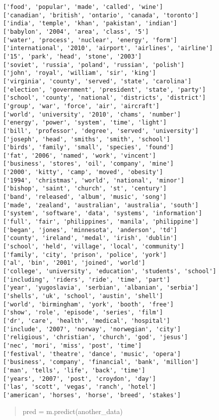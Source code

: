 \documentclass[11pt]{ctexart}
\begin{document}
\begin{Verbatim}[commandchars=\\\{\}]
['food', 'popular', 'made', 'called', 'wine']
['canadian', 'british', 'ontario', 'canada', 'toronto']
['india', 'temple', 'khan', 'pakistan', 'indian']
['babylon', '2004', 'area', 'class', '5']
['water', 'process', 'nuclear', 'energy', 'form']
['international', '2010', 'airport', 'airlines', 'airline']
['15', 'park', 'head', 'stone', '2003']
['soviet', 'russia', 'poland', 'russian', 'polish']
['john', 'royal', 'william', 'sir', 'king']
['virginia', 'county', 'served', 'state', 'carolina']
['election', 'government', 'president', 'state', 'party']
['school', 'county', 'national', 'districts', 'district']
['group', 'war', 'force', 'air', 'aircraft']
['world', 'university', '2010', 'chams', 'number']
['energy', 'power', 'system', 'time', 'light']
['bill', 'professor', 'degree', 'served', 'university']
['joseph', 'head', 'smiths', 'smith', 'school']
['birds', 'family', 'small', 'species', 'found']
['fat', '2006', 'named', 'work', 'vincent']
['business', 'stores', 'oil', 'company', 'mine']
['2000', 'kitty', 'camp', 'moved', 'obesity']
['1994', 'christmas', 'world', 'national', 'minor']
['bishop', 'saint', 'church', 'st', 'century']
['band', 'released', 'album', 'music', 'song']
['made', 'zealand', 'australian', 'australia', 'south']
['system', 'software', 'data', 'systems', 'information']
['full', 'fair', 'philippines', 'manila', 'philippine']
['began', 'jones', 'minnesota', 'anderson', 'td']
['county', 'ireland', 'medal', 'irish', 'dublin']
['school', 'held', 'village', 'local', 'community']
['family', 'city', 'prison', 'police', 'york']
['al', 'bin', '2001', 'joined', 'world']
['college', 'university', 'education', 'students', 'school']
['including', 'riders', 'ride', 'time', 'part']
['year', 'yugoslavia', 'serbian', 'albanian', 'serbia']
['shells', 'uk', 'school', 'austin', 'shell']
['world', 'birmingham', 'york', 'booth', 'free']
['show', 'role', 'episode', 'series', 'film']
['dr', 'care', 'health', 'medical', 'hospital']
['include', '2007', 'norway', 'norwegian', 'city']
['religious', 'christian', 'church', 'god', 'jesus']
['nec', 'mori', 'miss', 'post', 'time']
['festival', 'theatre', 'dance', 'music', 'opera']
['business', 'company', 'financial', 'bank', 'million']
['man', 'tells', 'life', 'back', 'time']
['years', '2007', 'post', 'croydon', 'day']
['las', 'scott', 'vegas', 'ranch', 'hotel']
['american', 'horses', 'horse', 'breed', 'stakes']

    \end{Verbatim}

    \begin{quote}
pred = m.predict(another\_data)
\end{quote}
\end{document}
